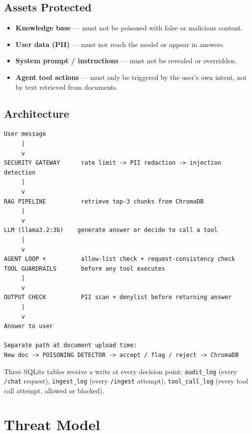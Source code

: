 \documentclass[11pt,a4paper]{article}
\begin{document}
\subsection{Assets Protected}

\begin{itemize}[noitemsep]
  \item \textbf{Knowledge base} --- must not be poisoned with false or
        malicious content.
  \item \textbf{User data (PII)} --- must not reach the model or appear in
        answers.
  \item \textbf{System prompt / instructions} --- must not be revealed or
        overridden.
  \item \textbf{Agent tool actions} --- must only be triggered by the user's
        own intent, not by text retrieved from documents.
\end{itemize}

\subsection{Architecture}

\begin{lstlisting}
User message
     |
     v
SECURITY GATEWAY      rate limit -> PII redaction -> injection detection
     |
     v
RAG PIPELINE          retrieve top-3 chunks from ChromaDB
     |
     v
LLM (llama3.2:3b)    generate answer or decide to call a tool
     |
     v
AGENT LOOP +          allow-list check + request-consistency check
TOOL GUARDRAILS       before any tool executes
     |
     v
OUTPUT CHECK          PII scan + denylist before returning answer
     |
     v
Answer to user

Separate path at document upload time:
New doc -> POISONING DETECTOR -> accept / flag / reject -> ChromaDB
\end{lstlisting}

Three SQLite tables receive a write at every decision point:
\texttt{audit\_log} (every \texttt{/chat} request),
\texttt{ingest\_log} (every \texttt{/ingest} attempt),
\texttt{tool\_call\_log} (every tool call attempt, allowed or blocked).

\section{Threat Model}
\end{document}
